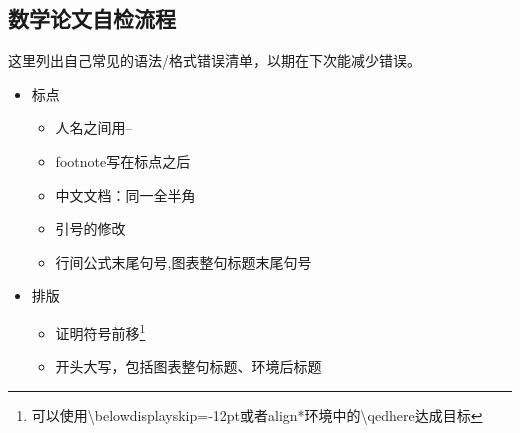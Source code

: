 \documentclass[11pt]{amsart}
\begin{document}
\subsection{数学论文自检流程}
这里列出自己常见的语法/格式错误清单，以期在下次能减少错误。
\begin{itemize}
\item 标点
\begin{itemize}
\item 人名之间用--
\item footnote写在标点之后
\item 中文文档：同一全半角
\item 引号的修改
\item 行间公式末尾句号,图表整句标题末尾句号
\end{itemize}
\item 排版
\begin{itemize}
\item 证明符号前移\footnote{可以使用\textbackslash belowdisplayskip=-12pt或者align*环境中的\textbackslash qedhere达成目标}
\item 开头大写，包括图表整句标题、环境后标题
\end{itemize}
\end{itemize}


 
   



 








\begin{thebibliography}{99}

 


  

\end{thebibliography}
\end{document}
